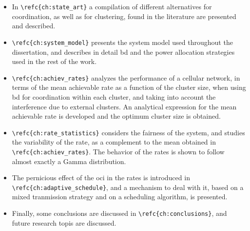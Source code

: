 \begin{itemize}
    \item In \verb+\refc{ch:state_art}+ a compilation of different alternatives for
        coordination, as well as for clustering, found in the literature are
        presented and described.
    \item \verb+\refc{ch:system_model}+ presents the system model used throughout the
        dissertation, and describes in detail \gls{bd} and the power allocation
        strategies used in the rest of the work.
    \item \verb+\refc{ch:achiev_rates}+ analyzes the performance of a cellular network,
        in terms of the mean achievable rate as a function of the cluster size,
        when using \gls{bd} for coordination within each cluster, and taking
        into account the interference due to external clusters. An analytical
        expression for the mean achievable rate is developed and the optimum
        cluster size is obtained.
    \item \verb+\refc{ch:rate_statistics}+ considers the fairness of the system, and
        studies the variability of the rate, as a complement to the mean
        obtained in \verb+\refc{ch:achiev_rates}+. The behavior of the rates is shown
        to follow almost exactly a Gamma distribution.
    \item The pernicious effect of the \gls{oci} in the rates is introduced in
        \verb+\refc{ch:adaptive_schedule}+, and a mechanism to deal with it, based on
        a mixed tranmission strategy and on a scheduling algorithm, is
        presented.
    \item Finally, some conclusions are discussed in \verb+\refc{ch:conclusions}+, and
        future research topis are discussed.
\end{itemize}
